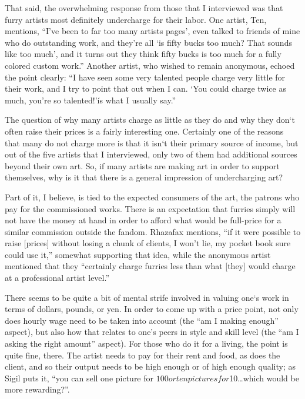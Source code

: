 That said, the overwhelming response from those that I interviewed was that furry artists most definitely undercharge for their labor. One artist, Ten, mentions, ``I've been to far too many artists pages', even talked to friends of mine who do outstanding work, and they're all `is fifty bucks too much? That sounds like too much', and it turns out they think fifty bucks is too much for a fully colored custom work.'' Another artist, who wished to remain anonymous, echoed the point clearly: ``I have seen some very talented people charge very little for their work, and I try to point that out when I can. `You could charge twice as much, you're so talented!'\' is what I usually say.''

The question of why many artists charge as little as they do and why they don`t often raise their prices is a fairly interesting one. Certainly one of the reasons that many do not charge more is that it isn`t their primary source of income, but out of the five artists that I interviewed, only two of them had additional sources beyond their own art. So, if many artists are making art in order to support themselves, why is it that there is a general impression of undercharging art?

Part of it, I believe, is tied to the expected consumers of the art, the patrons who pay for the commissioned works. There is an expectation that furries simply will not have the money at hand in order to afford what would be full-price for a similar commission outside the fandom. Rhazafax mentions, ``if it were possible to raise [prices] without losing a chunk of clients, I won't lie, my pocket book sure could use it,'' somewhat supporting that idea, while the anonymous artist mentioned that they ``certainly charge furries less than what [they] would charge at a professional artist level.''

There seems to be quite a bit of mental strife involved in valuing one`s work in terms of dollars, pounds, or yen.  In order to come up with a price point, not only does hourly wage need to be taken into account (the ``am I making enough'' aspect), but also how that relates to one's peers in style and skill level (the ``am I asking the right amount'' aspect).  For those who do it for a living, the point is quite fine, there.  The artist needs to pay for their rent and food, as does the client, and so their output needs to be high enough or of high enough quality; as Sigil puts it, ``you can sell one picture for $100 or ten pictures for $10…which would be more rewarding?''.

